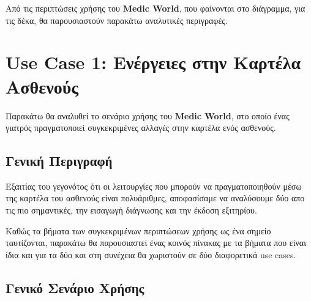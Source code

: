 \documentclass{article}
\begin{document}
\vspace{0.2cm}

Από τις περιπτώσεις χρήσης του \textbf{Medic World}, που φαίνονται στο διάγραμμα, για τις δέκα, θα παρουσιαστούν παρακάτω αναλυτικές περιγραφές.

\newpage

\section{Use Case 1: Ενέργειες στην Καρτέλα Ασθενούς}

Παρακάτω θα αναλυθεί το σενάριο χρήσης του \textbf{Medic World}, στο οποίο ένας γιατρός πραγματοποιεί συγκεκριμένες αλλαγές στην καρτέλα ενός ασθενούς.

\subsection{Γενική Περιγραφή}

Εξαιτίας του γεγονότος ότι οι λειτουργίες που μπορούν να πραγματοποιηθούν μέσω της καρτέλα του ασθενούς είναι πολυάριθμες, αποφασίσαμε να αναλύσουμε δύο απο τις πιο σημαντικές, την εισαγωγή διάγνωσης και την έκδοση εξιτηρίου.
\par Καθώς τα βήματα των συγκεκριμένων περιπτώσεων χρήσης ως ένα σημείο ταυτίζονται, παρακάτω θα παρουσιαστεί ένας κοινός πίνακας με τα βήματα που είναι ίδια και για τα δύο και στη συνέχεια θα χωριστούν σε δύο διαφορετικά use cases. 

 \subsection{Γενικό Σενάριο Χρήσης}
 
\end{document}
